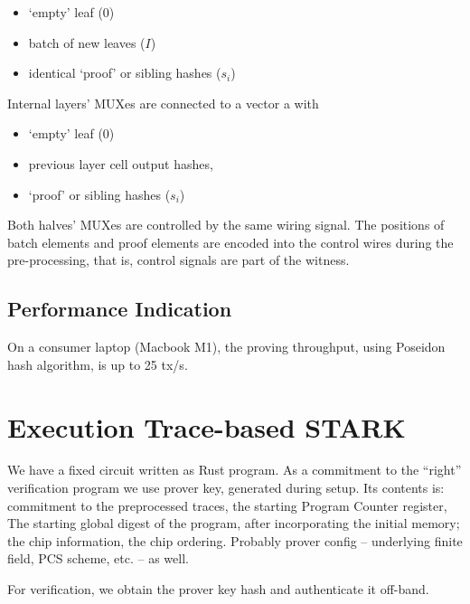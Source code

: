 \documentclass{llncs}
\begin{document}
\begin{itemize}
    \item `empty' leaf ($0$)
    \item batch of new leaves ($I$)
    \item identical `proof' or sibling hashes ($s_i$)
\end{itemize}

Internal layers' MUXes are connected to a vector a with
\begin{itemize}
    \item `empty' leaf ($0$)
    \item previous layer cell output hashes,
    \item `proof' or sibling hashes ($s_i$)
\end{itemize}

Both halves' MUXes are controlled by the same wiring signal. The positions of batch elements and proof elements are encoded into the control wires during the pre-processing, that is, control signals are part of the witness.

\subsection{Performance Indication}

On a consumer laptop (Macbook M1), the proving throughput, using Poseidon hash algorithm, is up to 25 tx/s.

\section{Execution Trace-based STARK}

We have a fixed circuit written as Rust program. As a commitment to the ``right'' verification program we use prover key, generated during setup. Its contents is: commitment to the preprocessed traces, the starting Program Counter register, The starting global digest of the program, after incorporating the initial memory; the chip information, the chip ordering. Probably prover config -- underlying finite field, PCS scheme, etc. -- as well.

For verification, we obtain the prover key hash and authenticate it off-band.
\end{document}
